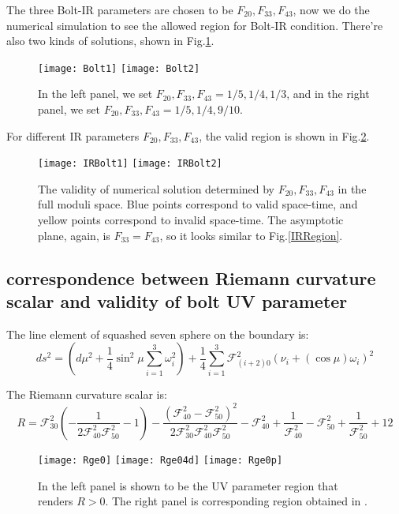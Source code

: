 \documentclass[12pt, a4paper]{article}
\numberwithin{equation}{section}
\newcommand{\be}{\begin{equation}}
\newcommand{\ee}{\end{equation}}
\newcommand{\cF}{\mathcal{F}}
\begin{document}
	The three Bolt-IR parameters are chosen to be $F_{20}, F_{33}, F_{43}$, now we do the numerical simulation to see the allowed region for Bolt-IR condition. There're also two kinds of solutions, shown in Fig.\ref{Bolt}.
	
\begin{figure}[h]
	\texttt{[image: Bolt1]}
	\hfill
	\texttt{[image: Bolt2]}
	\caption{{\rm In the left panel, we set $F_{20}, F_{33}, F_{43}= 1/5, 1/4, 1/3$, and in the right panel, we set $F_{20}, F_{33}, F_{43} = 1/5, 1/4, 9/10$. }}
	\label{Bolt}
\end{figure}

	For different IR parameters $F_{20}, F_{33}, F_{43}$, the valid region is shown in Fig.\ref{IRBolt}. 
	
\begin{figure}[t]
	\centering
	\texttt{[image: IRBolt1]}
	\hfil
	\texttt{[image: IRBolt2]}
	\caption{{\rm The validity of numerical solution determined by  $F_{20},F_{33},F_{43}$ in the full moduli space. Blue points correspond to valid space-time, and yellow points correspond to invalid space-time. The asymptotic plane, again, is $F_{33} = F_{43}$, so it looks similar to Fig.\ref{IRRegion}.}}
	\label{IRBolt}
\end{figure}
	
\subsection{correspondence between Riemann curvature scalar and validity of bolt UV parameter}

	The line element of squashed seven sphere on the boundary is:
\be
	ds^2 = \left(d\mu^2 +\frac{1}{4}\sin^2\mu \sum\limits_{i=1}^3 \omega_i^2  \right) + \frac{1}{4}\sum\limits_{i=1}^3 \cF_{(i+2)0}^2(\nu_i + (\cos\mu)\omega_i)^2
	\label{UVsquash1}
\ee

	The Riemann curvature scalar is:
\be
R = \cF_{30}^2 \left(-\frac{1}{2 \cF_{40}^2 \cF_{50}^2}-1\right)-\frac{\left(\cF_{40}^2-\cF_{50}^2\right)^2}{2 \cF_{30}^2 \cF_{40}^2 \cF_{50}^2}-\cF_{40}^2+\frac{1}{\cF_{40}^2}-\cF_{50}^2+\frac{1}{\cF_{50}^2}+12
\ee

\begin{figure}[h]
	\texttt{[image: Rge0]}
	\texttt{[image: Rge04d]}
		\texttt{[image: Rge0p]}
	\caption{{\rm In the left panel is shown to be the UV parameter region that renders $R>0$. The right panel is corresponding region obtained in \cite{Bobev:2016sh}.}}
	\label{Rge0}
\end{figure}
\end{document}
